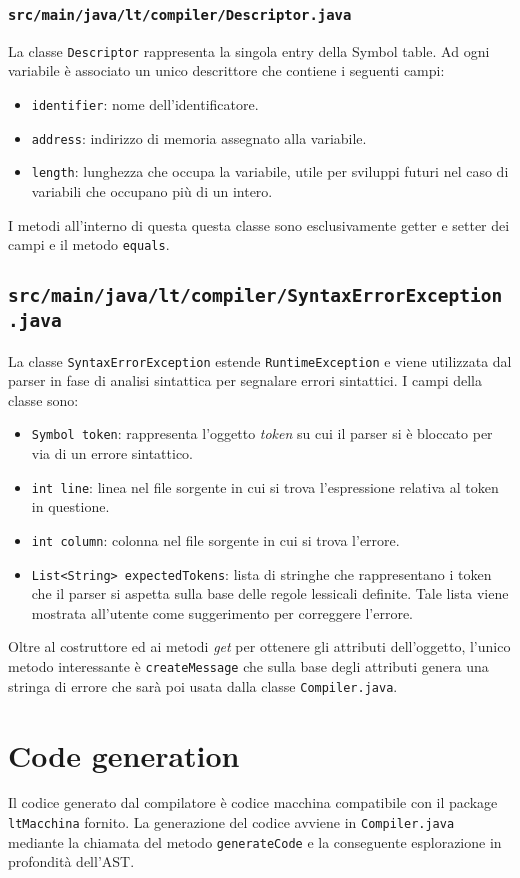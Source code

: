 \documentclass[10pt,a4paper]{article}
\begin{document}
\subsubsection{\texttt{src/main/java/lt/compiler/Descriptor.java}}
La classe \texttt{Descriptor} rappresenta la singola entry della Symbol table. Ad ogni variabile è associato un unico descrittore che contiene i seguenti campi:
\begin{itemize}
\item \texttt{identifier}: nome dell'identificatore.
\item \texttt{address}: indirizzo di memoria assegnato alla variabile.
\item \texttt{length}: lunghezza che occupa la variabile, utile per sviluppi futuri nel caso di variabili che occupano più di un intero.
\end{itemize}
I metodi all'interno di questa questa classe sono esclusivamente getter e setter dei campi e il metodo \texttt{equals}.

\subsection{\texttt{src/main/java/lt/compiler/SyntaxErrorException.java}}
La classe \texttt{SyntaxErrorException} estende \texttt{RuntimeException} e viene utilizzata dal parser in fase di analisi sintattica per segnalare errori sintattici. I campi della classe sono:
\begin{itemize}
\item \texttt{Symbol token}: rappresenta l'oggetto \textit{token} su cui il parser si è bloccato per via di un errore sintattico.
\item \texttt{int line}: linea nel file sorgente in cui si trova l'espressione relativa al token in questione.
\item \texttt{int column}: colonna nel file sorgente in cui si trova l'errore.
\item \texttt{List<String> expectedTokens}: lista di stringhe che rappresentano i token che il parser si aspetta sulla base delle regole lessicali definite. Tale lista viene mostrata all'utente come suggerimento per correggere l'errore.
\end{itemize}
Oltre al costruttore ed ai metodi \textit{get} per ottenere gli attributi dell'oggetto, l'unico metodo interessante è \texttt{createMessage} che sulla base degli attributi genera una stringa di errore che sarà poi usata dalla classe \texttt{Compiler.java}.

\section{Code generation}
Il codice generato dal compilatore è codice macchina compatibile con il package \texttt{ltMacchina} fornito. La generazione del codice avviene in \texttt{Compiler.java} mediante la chiamata del metodo \texttt{generateCode} e la conseguente esplorazione in profondità dell'AST.
\end{document}
